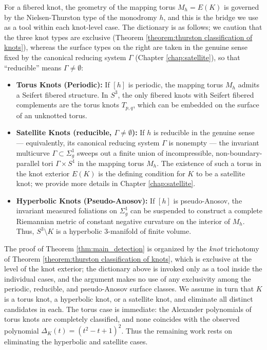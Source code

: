 For a fibered knot, the geometry of the mapping torus $M_h = E(K)$ is governed by the Nielsen-Thurston type of the monodromy $h$, and this is the bridge we use as a tool within each knot-level case. The dictionary is as follows; we caution that the three knot types are exclusive (Theorem \ref{theorem:thurston classification of knots}), whereas the surface types on the right are taken in the genuine sense fixed by the canonical reducing system $\Gamma$ (Chapter \ref{chap:satellite}), so that ``reducible'' means $\Gamma \neq \emptyset$:
\begin{itemize}
    \item \textbf{Torus Knots (Periodic):} If $[h]$ is periodic, the mapping torus $M_h$ admits a Seifert fibered structure. In $S^3$, the only fibered knots with Seifert fibered complements are the torus knots $T_{p,q}$, which can be embedded on the surface of an unknotted torus.
    \item \textbf{Satellite Knots (reducible, $\Gamma \neq \emptyset$):} If $h$ is reducible in the genuine sense --- equivalently, its canonical reducing system $\Gamma$ is nonempty --- the invariant multicurve $\Gamma \subset \Sigma_g^1$ sweeps out a finite union of incompressible, non-boundary-parallel tori $\Gamma \times S^1$ in the mapping torus $M_h$. The existence of such a torus in the knot exterior $E(K)$ is the defining condition for $K$ to be a satellite knot; we provide more details in Chapter \ref{chap:satellite}.
    \item \textbf{Hyperbolic Knots (Pseudo-Anosov):} If $[h]$ is pseudo-Anosov, the invariant measured foliations on $\Sigma_g^1$ can be suspended to construct a complete Riemannian metric of constant negative curvature on the interior of $M_h$. Thus, $S^3 \setminus K$ is a hyperbolic 3-manifold of finite volume.
\end{itemize}

The proof of Theorem \ref{thm:main_detection} is organized by the \emph{knot} trichotomy of Theorem \ref{theorem:thurston classification of knots}, which is exclusive at the level of the knot exterior; the dictionary above is invoked only as a tool inside the individual cases, and the argument makes no use of any exclusivity among the periodic, reducible, and pseudo-Anosov surface classes. We assume in turn that $K$ is a torus knot, a hyperbolic knot, or a satellite knot, and eliminate all distinct candidates in each. The torus case is immediate: the Alexander polynomials of torus knots are completely classified, and none coincides with the observed polynomial $\Delta_K(t) = (t^2 - t + 1)^2$. Thus the remaining work rests on eliminating the hyperbolic and satellite cases.

